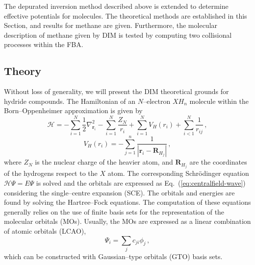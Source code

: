 \documentclass[10pt]{article}
\begin{document}
The depurated inversion method described above is extended to determine 
effective potentials for molecules. The theoretical methods are 
established in this Section, and results for methane are given. 
Furthermore, the molecular description of methane given by DIM is 
tested by computing two collisional processes within the FBA.

\subsection{Theory}

Without loss of generality, we will present the DIM theoretical grounds 
for hydride compounds. The Hamiltonian of an $N$--electron $X\!H_n$ 
molecule within the Born--Oppenheimer approximation is given by
\begin{equation}
 \mathcal{H}=-\sum_{i=1}^N \frac{1}{2} \nabla^2_{\mathbf{r}_i} 
 - \sum_{i=1}^N \frac{Z_N}{r_i} 
 + \sum_{i=1}^N V_H(r_i)
 + \sum_{i<1}^N \frac{1}{r_{ij}}\,,
\end{equation}
\begin{equation}
 V_H(r_i) = -\sum_{j=1}^{n} \frac{1}{\left|\mathbf{r}_i-\mathbf{R}_{H_j}\right|}\,,
\end{equation}
where $Z_N$ is the nuclear charge of the heavier atom, and 
$\mathbf{R}_{H_j}$ are the coordinates of the hydrogens respect to 
the $X$ atom. The corresponding Schr\"odinger equation 
$\mathcal{H}\Psi=E\Psi$ is solved and the orbitals are expressed as
Eq.~(\ref{eq:centralfield-wave}) considering the single--centre
expansion (SCE). The orbitals and energies are found by solving the 
Hartree--Fock equations. The computation of these 
equations generally relies on the use of finite basis sets for the 
representation of the molecular orbitals (MOs). Usually, the MOs are 
expressed as a linear combination of atomic orbitals (LCAO),
\begin{equation}
 \Psi_i=\sum_j c_{ji} \phi_j\,,
\end{equation}
which can be constructed with Gaussian--type orbitals (GTO) basis 
sets. 
\end{document}
